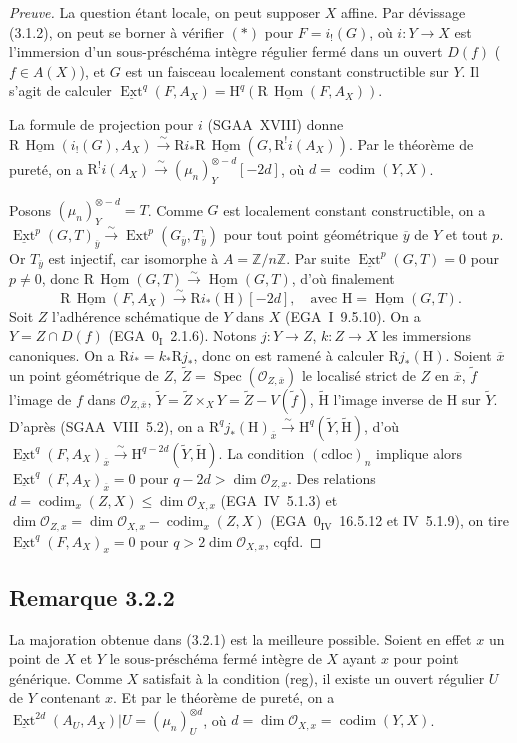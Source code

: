\documentclass[11pt]{article}
\DeclareMathOperator{\codim}{codim}
\providecommand{\cO}{\mathcal{O}}
\providecommand{\wt}[1]{\widetilde{#1}}
\renewcommand{\H}{\mathrm{H}}
\DeclareMathOperator{\Hom}{Hom}
\DeclareMathOperator{\Ext}{Ext}
\DeclareMathOperator{\Spec}{Spec}
\newcommand{\R}{\mathrm{R}}\newcommand{\RHomCore}{\mathrm{RHom}}
\newcommand{\Z}{\mathbb{Z}}
\newcommand{\ol}[1]{\overline{#1}}
\providecommand{\Hom}{\operatorname{Hom}}
\providecommand{\R}{\mathrm R}
\providecommand{\Z}{\mathbb Z}
\providecommand{\Spec}{\operatorname{Spec}}
\providecommand{\Spec}{\operatorname{Spec}}
\providecommand{\Hom}{\operatorname{Hom}}
\providecommand{\Spec}{\operatorname{Spec}}
\providecommand{\Spec}{\operatorname{Spec}}
\begin{document}
\begin{proof}[Preuve]
La question étant locale, on peut supposer $X$ affine. Par dévissage (3.1.2), on peut se borner à vérifier $(*)$ pour $F = i_{!}(G)$, où $i : Y \to X$ est l'immersion d'un sous-préschéma intègre régulier fermé dans un ouvert $D(f)$ ($f \in A(X)$), et $G$ est un faisceau localement constant constructible sur $Y$. Il s'agit de calculer $\underline{\Ext}^q(F, A_X) = \H^q(\R\,\underline{\Hom}(F, A_X))$.

La formule de projection pour $i$ (SGAA~XVIII) donne $\R\,\underline{\Hom}(i_{!}(G), A_X) \xrightarrow{\sim} \R i_{*} \R\,\underline{\Hom}(G, \R^{!}i(A_X))$. Par le théorème de pureté, on a $\R^{!}i(A_X) \xrightarrow{\sim} (\mu_n)^{\otimes -d}_Y[-2d]$, où $d = \codim(Y,X)$.

Posons $(\mu_n)^{\otimes -d}_Y = T$. Comme $G$ est localement constant constructible, on a $\underline{\Ext}^p(G,T)_{\ol{y}} \xrightarrow{\sim} \Ext^p(G_{\ol{y}}, T_{\ol{y}})$ pour tout point géométrique $\ol{y}$ de $Y$ et tout $p$. Or $T_{\ol{y}}$ est injectif, car isomorphe à $A = \Z/n\Z$. Par suite $\underline{\Ext}^p(G,T) = 0$ pour $p \neq 0$, donc $\R\,\underline{\Hom}(G,T) \xrightarrow{\sim} \underline{\Hom}(G,T)$, d'où finalement
\[
\R\,\underline{\Hom}(F, A_X) \xrightarrow{\sim} \R i_{*}(\H)[-2d], \quad \text{avec } \H = \underline{\Hom}(G,T).
\]
Soit $Z$ l'adhérence schématique de $Y$ dans $X$ (EGA~I~9.5.10). On a $Y = Z \cap D(f)$ (EGA~$0_{\mathrm{I}}$~2.1.6). Notons $j : Y \to Z$, $k : Z \to X$ les immersions canoniques. On a $\R i_{*} = k_{*} \R j_{*}$, donc on est ramené à calculer $\R j_{*}(\H)$. Soient $\ol{x}$ un point géométrique de $Z$, $\wt{Z} = \Spec(\cO_{Z,\ol{x}})$ le localisé strict de $Z$ en $\ol{x}$, $\wt{f}$ l'image de $f$ dans $\cO_{Z,\ol{x}}$, $\wt{Y} = \wt{Z} \times_X Y = \wt{Z} - V(\wt{f})$, $\wt{\H}$ l'image inverse de $\H$ sur $\wt{Y}$. D'après (SGAA~VIII~5.2), on a $\R^q j_{*}(\H)_{\ol{x}} \xrightarrow{\sim} \H^q(\wt{Y}, \wt{\H})$, d'où $\underline{\Ext}^q(F, A_X)_{\ol{x}} \xrightarrow{\sim} \H^{q-2d}(\wt{Y}, \wt{\H})$. La condition $(\mathrm{cdloc})_n$ implique alors $\underline{\Ext}^q(F, A_X)_{\ol{x}} = 0$ pour $q - 2d > \dim \cO_{Z,x}$. Des relations $d = \codim_{x}(Z,X) \leqslant \dim \cO_{X,x}$ (EGA~IV~5.1.3) et $\dim \cO_{Z,x} = \dim \cO_{X,x} - \codim_{x}(Z,X)$ (EGA~$0_{\mathrm{IV}}$~16.5.12 et IV~5.1.9), on tire $\underline{\Ext}^q(F, A_X)_x = 0$ pour $q > 2\dim \cO_{X,x}$, cqfd.
\end{proof}

\subsection*{Remarque 3.2.2}
La majoration obtenue dans (3.2.1) est la meilleure possible. Soient en effet $x$ un point de $X$ et $Y$ le sous-préschéma fermé intègre de $X$ ayant $x$ pour point générique. Comme $X$ satisfait à la condition (reg), il existe un ouvert régulier $U$ de $Y$ contenant $x$. Et par le théorème de pureté, on a $\underline{\Ext}^{2d}(A_U, A_X)|U = (\mu_n)^{\otimes d}_U$, où $d = \dim \cO_{X,x} = \codim(Y,X)$.
\end{document}
